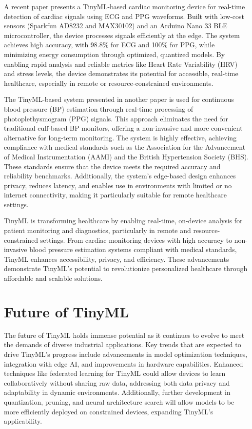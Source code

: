 \documentclass[twocolumn]{article}
\begin{document}
A recent paper presents a TinyML-based cardiac monitoring device for real-time detection of cardiac signals using ECG and PPG waveforms. Built with low-cost sensors (Sparkfun AD8232 and MAX30102) and an Arduino Nano 33 BLE microcontroller, the device processes signals efficiently at the edge. The system achieves high accuracy, with 98.8\% for ECG and 100\% for PPG, while minimizing energy consumption through optimized, quantized models. By enabling rapid analysis and reliable metrics like Heart Rate Variability (HRV) and stress levels, the device demonstrates its potential for accessible, real-time healthcare, especially in remote or resource-constrained environments.\cite{r_tiny_2024}


The TinyML-based system presented in another paper is used for continuous blood pressure (BP) estimation through real-time processing of photoplethysmogram (PPG) signals. This approach eliminates the need for traditional cuff-based BP monitors, offering a non-invasive and more convenient alternative for long-term monitoring. The system is highly effective, achieving compliance with medical standards such as the Association for the Advancement of Medical Instrumentation (AAMI) and the British Hypertension Society (BHS). These standards ensure that the device meets the required accuracy and reliability benchmarks. Additionally, the system’s edge-based design enhances privacy, reduces latency, and enables use in environments with limited or no internet connectivity, making it particularly suitable for remote healthcare settings. \cite{sun_case_2023}


TinyML is transforming healthcare by enabling real-time, on-device analysis for patient monitoring and diagnostics, particularly in remote and resource-constrained settings. From cardiac monitoring devices with high accuracy to non-invasive blood pressure estimation systems compliant with medical standards, TinyML enhances accessibility, privacy, and efficiency. These advancements demonstrate TinyML’s potential to revolutionize personalized healthcare through affordable and scalable solutions.


\section{Future of TinyML }
\label{future_of_tinyml}

The future of TinyML holds immense potential as it continues to evolve to meet the demands of diverse industrial applications. Key trends that are expected to drive TinyML's progress include advancements in model optimization techniques, integration with edge AI, and improvements in hardware capabilities. Enhanced techniques like federated learning for TinyML could allow devices to learn collaboratively without sharing raw data, addressing both data privacy and adaptability in dynamic environments. Additionally, further development in quantization, pruning, and neural architecture search will allow models to be more efficiently deployed on constrained devices, expanding TinyML’s applicability.
\end{document}
